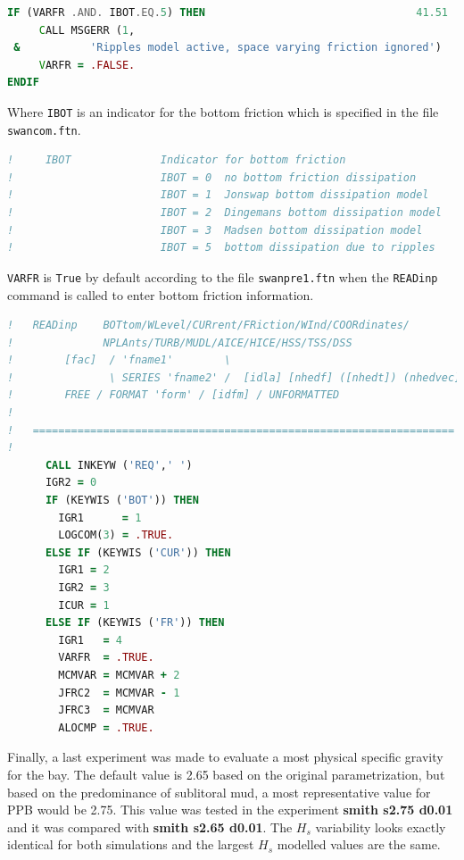 \documentclass[12pt]{article}
\begin{document}
\begin{lstlisting}[language=Fortran]
IF (VARFR .AND. IBOT.EQ.5) THEN                                 41.51
     CALL MSGERR (1,
 &           'Ripples model active, space varying friction ignored')
     VARFR = .FALSE.
ENDIF
\end{lstlisting}

Where \verb|IBOT| is an indicator for the bottom friction which is specified in the file \verb|swancom.ftn|.

\begin{lstlisting}[language=Fortran]
!     IBOT              Indicator for bottom friction
!                       IBOT = 0  no bottom friction dissipation
!                       IBOT = 1  Jonswap bottom dissipation model
!                       IBOT = 2  Dingemans bottom dissipation model
!                       IBOT = 3  Madsen bottom dissipation model
!                       IBOT = 5  bottom dissipation due to ripples
\end{lstlisting}

\verb|VARFR| is \verb|True| by default according to the file \verb|swanpre1.ftn| when the \verb|READinp| command is called to enter bottom friction information.

\begin{lstlisting}[language=Fortran]
!   READinp    BOTtom/WLevel/CURrent/FRiction/WInd/COORdinates/              &
!              NPLAnts/TURB/MUDL/AICE/HICE/HSS/TSS/DSS                       &
!        [fac]  / 'fname1'        \
!               \ SERIES 'fname2' /  [idla] [nhedf] ([nhedt]) (nhedvec])     &
!        FREE / FORMAT 'form' / [idfm] / UNFORMATTED
!
!   ==================================================================
!
      CALL INKEYW ('REQ',' ')
      IGR2 = 0
      IF (KEYWIS ('BOT')) THEN
        IGR1      = 1
        LOGCOM(3) = .TRUE.                                                30.21
      ELSE IF (KEYWIS ('CUR')) THEN
        IGR1 = 2
        IGR2 = 3
        ICUR = 1
      ELSE IF (KEYWIS ('FR')) THEN
        IGR1   = 4
        VARFR  = .TRUE.
        MCMVAR = MCMVAR + 2                                               40.00
        JFRC2  = MCMVAR - 1                                               40.00
        JFRC3  = MCMVAR                                                   40.00
        ALOCMP = .TRUE.                                                   40.97
\end{lstlisting}
    
Finally, a last experiment was made to evaluate a most physical specific gravity for the bay. The default value is 2.65 based on the original parametrization, but based on the predominance of sublitoral mud, a most representative value for PPB would be 2.75. This value was tested in the experiment \textbf{smith s2.75 d0.01} and it was compared with \textbf{smith s2.65 d0.01}. The $H_s$ variability looks exactly identical for both simulations and the largest $H_s$ modelled values are the same. 
\end{document}
